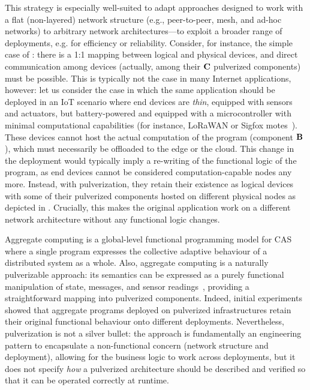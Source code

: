 This strategy is especially well-suited to adapt approaches designed to work with a flat (non-layered) network structure (e.g., peer-to-peer, mesh, and ad-hoc networks) 
 to arbitrary network architectures---to exploit a broader range of deployments, e.g. for efficiency or reliability.
%
Consider, for instance, the simple case of
:
there is a 1:1 mapping between logical and physical devices, and direct communication among devices (actually, among their $\mathbf{C}$ pulverized components) must be possible.
%
This is typically not the case in many Internet applications, however:
let us consider the case in which the same application should be deployed in an IoT scenario where end devices are \emph{thin},
equipped with sensors and actuators, but battery-powered and equipped with a microcontroller with minimal computational capabilities
(for instance, LoRaWAN or Sigfox motes~\cite{MekkiBCM18}).
%
These devices cannot host the actual computation of the program (component $\mathbf{B}$), which must necessarily be offloaded to the edge or the cloud.
%
This change in the deployment would typically imply a re-writing of the functional logic of the program,
as end devices cannot be considered computation-capable nodes any more.
%
Instead, with pulverization, they retain their existence as logical devices
with some of their pulverized components hosted on different physical nodes as depicted in
.
%
Crucially, this makes the original application work on a different network architecture without any functional logic changes.

Aggregate computing is a global-level functional programming model for CAS
 where a single program expresses the collective adaptive behaviour of a distributed system as a whole.
Also, aggregate computing is a naturally pulverizable approach:
its semantics can be expressed as a purely functional manipulation of state, messages, and sensor readings~\cite{DBLP:journals/jlap/ViroliBDACP19},
providing a straightforward mapping into pulverized components.
%
Indeed, initial experiments~\cite{DBLP:journals/fi/CasadeiPPVW20}
showed that aggregate programs deployed on pulverized infrastructures retain their original functional behaviour onto different deployments.
%
Nevertheless, pulverization is not a silver bullet:
the approach is fundamentally an engineering pattern to encapsulate a non-functional concern
(network structure and deployment),
allowing for the business logic to work across deployments,
but it does not specify \emph{how} 
 a pulverized architecture should be described
 and verified so that it can be operated correctly at runtime.

